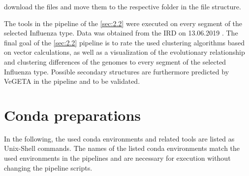     download the files and move them to the respective folder in the file structure.

    The tools in the pipeline of the \autoref{sec:2.2} were executed on every segment of the selected Influenza type. Data was obtained from the \gls{IRD} on 13.06.2019 \autocite{IRD}. The final goal %
    of the \autoref{sec:2.2} pipeline is to rate the used clustering algorithms based on vector calculations, as well as a visualization of the evolutionary relationship and clustering differences of the genomes to every segment of the selected Influenza type. Possible secondary structures are furthermore predicted by VeGETA in the pipeline and to be validated.%
    
\section{Conda preparations} \label{sec:2.1}
    
    In the following, the used conda environments and related tools are listed as Unix-Shell commands. The names of the listed conda environments match the used environments in the pipelines and are necessary for execution without changing the pipeline scripts. 
    
